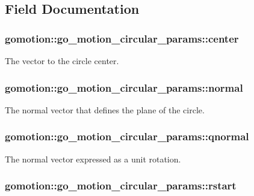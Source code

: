 \subsection{Field Documentation}
\hypertarget{structgomotion_1_1go__motion__circular__params_afcf8dda6a72f29ce49a61130adbf3971}{
\subsubsection[{center}]{ gomotion\-::go\-\_\-motion\-\_\-circular\-\_\-params\-::center}}\label{structgomotion_1_1go__motion__circular__params_afcf8dda6a72f29ce49a61130adbf3971}
The vector to the circle center. \hypertarget{structgomotion_1_1go__motion__circular__params_af933e19d1dba3641d570a3aa42b9969b}{
\subsubsection[{normal}]{ gomotion\-::go\-\_\-motion\-\_\-circular\-\_\-params\-::normal}}\label{structgomotion_1_1go__motion__circular__params_af933e19d1dba3641d570a3aa42b9969b}
The normal vector that defines the plane of the circle. \hypertarget{structgomotion_1_1go__motion__circular__params_abd5283624621e9fb218671e9996eb3c3}{
\subsubsection[{qnormal}]{ gomotion\-::go\-\_\-motion\-\_\-circular\-\_\-params\-::qnormal}}\label{structgomotion_1_1go__motion__circular__params_abd5283624621e9fb218671e9996eb3c3}
The normal vector expressed as a unit rotation. \hypertarget{structgomotion_1_1go__motion__circular__params_aeee40430ac2667fef1fc6eba842427b7}{
\subsubsection[{rstart}]{ gomotion\-::go\-\_\-motion\-\_\-circular\-\_\-params\-::rstart}}\label{structgomotion_1_1go__motion__circular__params_aeee40430ac2667fef1fc6eba842427b7}
